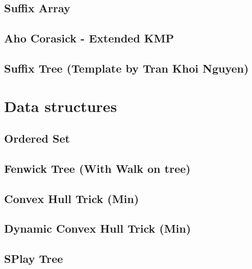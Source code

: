 \subsection{Suffix Array}
\raggedbottom
\hrulefill
\subsection{Aho Corasick - Extended KMP}
\raggedbottom
\hrulefill
\subsection{Suffix Tree (Template by Tran Khoi Nguyen)}
\raggedbottom
\hrulefill

\section{Data structures}
\subsection{Ordered Set}
\raggedbottom
\hrulefill
\subsection{Fenwick Tree (With Walk on tree)}
\raggedbottom
\hrulefill
\subsection{Convex Hull Trick (Min)}
\raggedbottom
\hrulefill
\subsection{Dynamic Convex Hull Trick (Min)}
\raggedbottom
\hrulefill
\subsection{SPlay Tree}
\raggedbottom
\hrulefill

